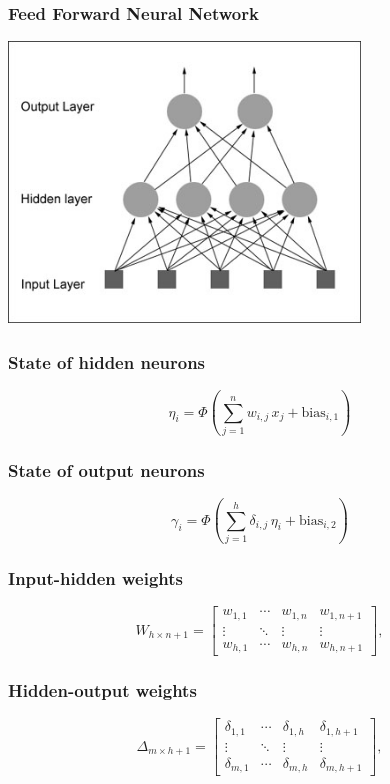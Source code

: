 \begin{frame}
    \frametitle{Feed Forward Neural Network}
\includegraphics[width=0.7\textwidth]{simple_feedforward_network}
\end{frame}


\begin{frame}
\frametitle{State of hidden neurons}
\[
  \eta_{i} =
  \Phi \left(
    \sum_{j=1}^{n}
    w_{i,j}\,x_j + \text{bias}_{i,1}
  \right)
\]
\end{frame}

\begin{frame}
\frametitle{State of output neurons}
\[
  \gamma_{i} =
  \Phi\left(
    \sum_{j=1}^{h}
    \delta_{i,j}\,\eta_i + \text{bias}_{i,2}
  \right)
\]
\end{frame}

\begin{frame}
    \frametitle{Input-hidden weights}
  \[
    W_{h \times {n+1}} =
    \left[
      \begin{array}{ccc|c}
        w_{1, 1} & \cdots & w_{1, n} & w_{1, n+1} \\
        \vdots   & \ddots & \vdots   & \vdots     \\
        w_{h, 1} & \cdots & w_{h, n} & w_{h, n+1}
      \end{array}
    \right],
  \]
\end{frame}

\begin{frame}
    \frametitle{Hidden-output weights}
  \[
    \Delta_{m \times h+1} =
    \left[
      \begin{array}{ccc|c}
        \delta_{1,1} & \cdots & \delta_{1,h} & \delta_{1,h+1}\\
        \vdots & \ddots &  \vdots & \vdots\\
        \delta_{m,1} & \cdots & \delta_{m,h} &\delta_{m,h+1}
      \end{array}
    \right],
  \]
\end{frame}

